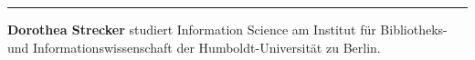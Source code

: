 \begin{center}\rule{0.5\linewidth}{0.5pt}\end{center}

\textbf{Dorothea Strecker} studiert Information Science am Institut für
Bibliotheks- und Informationswissenschaft der Humboldt-Universität zu
Berlin.
